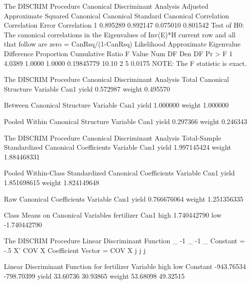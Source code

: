\documentclass{article}
\begin{document}
\begin{Woutput}
The DISCRIM Procedure
Canonical Discriminant Analysis
                           Adjusted    Approximate        Squared
           Canonical      Canonical       Standard      Canonical
         Correlation    Correlation          Error    Correlation
       1    0.895289       0.892147       0.075010       0.801542
                                                      Test of H0: The canonical correlations in the
                   Eigenvalues of Inv(E)*H               current row and all that follow are zero
                     = CanRsq/(1-CanRsq)
                                                     Likelihood Approximate
         Eigenvalue Difference Proportion Cumulative      Ratio     F Value Num DF Den DF Pr > F
       1     4.0389                1.0000     1.0000 0.19845779       10.10      2      5 0.0175
NOTE: The F statistic is exact.

The DISCRIM Procedure
Canonical Discriminant Analysis
Total Canonical Structure
Variable              Can1
yield             0.572987
weight            0.495570

Between Canonical Structure
Variable              Can1
yield             1.000000
weight            1.000000

Pooled Within Canonical Structure
Variable              Can1
yield             0.297366
weight            0.246343

The DISCRIM Procedure
Canonical Discriminant Analysis
Total-Sample Standardized Canonical Coefficients
Variable              Can1
yield          1.997145424
weight         1.884468331

Pooled Within-Class Standardized Canonical Coefficients
Variable              Can1
yield          1.851698615
weight         1.824149648

Raw Canonical Coefficients
Variable              Can1
yield          0.766676064
weight         1.251356335

Class Means on Canonical Variables
fertilizer              Can1
high             1.740442790
low             -1.740442790

The DISCRIM Procedure
Linear Discriminant Function
               _     -1 _                              -1 _
Constant = -.5 X' COV   X      Coefficient Vector = COV   X
                j        j                                 j

Linear Discriminant Function for fertilizer
Variable          high           low
Constant    -943.76534    -798.70399
yield         33.60736      30.93865
weight        53.68098      49.32515


\end{Woutput}
\end{document}
